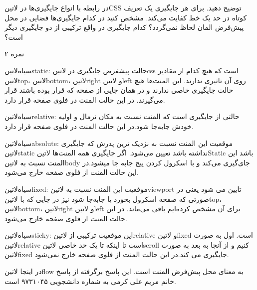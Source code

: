 
در رابطه با انواع جایگیری‌ها در ‌لاتین{CSS} توضیح دهید. برای هر جایگیری یک تعریف کوتاه در حد یک خط کفایت می‌کند. مشخص کنید در کدام
جایگیری‌ها فضایی در محل پیش‌فرض المان لحاظ نمی‌گردد؟ کدام جایگیری در واقع ترکیبی از دو جایگیری دیگر است؟

۲ نمره



 ‌سیاه{‌لاتین{static}}:
حالت پیشفرض جایگیری در ‌لاتین{css} است که هیچ کدام از مقادیر
‌لاتین{top}، ‌لاتین{bottom}، ‌لاتین{right} و ‌لاتین{left} روی آن تاثیری ندارند.
این المنت‌ها هیچ حالت جایگیری خاصی ندارند و در همان جایی از صفحه که قرار بوده باشند قرار می‌گیرند. در این
حالت المنت در فلوی صفحه قرار دارد.

 ‌سیاه{‌لاتین{relative}}:
حالتی از جایگیری است که المنت نسبت به مکان نرمال و اولیه خودش جابه‌جا شود.در این حالت المنت در فلوی
صفحه قرار دارد.

 ‌سیاه{‌لاتین{absolute}}:
موقعیت این المنت نسبت به نزدیک ترین پدرش که جایگیری ‌لاتین{static} نداشته باشد تعیین می‌شود.
اگر جایگیری همه
المنت‌ها ‌لاتین{Static} باشد این المنت نسبت به ‌لاتین{body} جای‌گیری می‌کند
و با اسکرول کردن پیج جابه جا میشود.در این
حالت المنت از فلوی صفحه خارج می‌شود.

 ‌سیاه{‌لاتین{fixed}}:
موقعیت این المنت نسبت به ‌لاتین{viewport} تایین می شود یعنی در صورتی که صفحه اسکرول بخورد یا جابه‌جا شود نیز
در جایی که با
‌لاتین{top}،
‌لاتین{bottom}،
‌لاتین{right} و
‌لاتین{left}
برای آن مشخص کرده‌ایم باقی می‌ماند. در این حالت المنت از فلوی صفحه
خارج می‌شود.

 ‌سیاه{‌لاتین{sticky}}:
این موقعیت ترکیبی از ‌لاتین{relative} و ‌لاتین{fixed} است. اول به صورت ‌لاتین{relative} است تا اینکه تا یک حد خاصی ‌لاتین{scroll} کنیم
و از آنجا به بعد به صورت ‌لاتین{fixed} جایگیری می کند.در این حالت المنت از فلوی صفحه خارج نمی‌شود.


در اینجا ‌لاتین{flow} به معنای محل پیش‌فرض المنت است. این پاسخ برگرفته از پاسخ خانم مریم علی کرمی
به شماره دانشجویی ۹۷۳۱۰۴۵ است.

